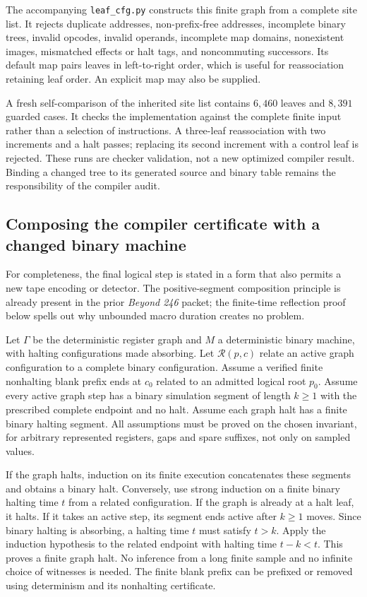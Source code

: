 The accompanying \texttt{leaf\_cfg.py} constructs this finite graph from
a complete site list.  It rejects duplicate addresses, non-prefix-free
addresses, incomplete binary trees, invalid opcodes, invalid operands,
incomplete map domains, nonexistent images, mismatched effects or halt
tags, and noncommuting successors.  Its default map pairs leaves in
left-to-right order, which is useful for reassociation retaining leaf
order.  An explicit map may also be supplied.

A fresh self-comparison of the inherited site list contains $6,460$
leaves and $8,391$ guarded cases.  It checks the implementation against
the complete finite input rather than a selection of instructions.
A three-leaf reassociation with two increments and a halt passes;
replacing its second increment with a control leaf is rejected.
These runs are checker validation, not a new optimized compiler result.
Binding a changed tree to its generated source and binary table remains
the responsibility of the compiler audit.

\subsection{Composing the compiler certificate with a changed binary machine}

For completeness, the final logical step is stated in a form that also
permits a new tape encoding or detector.  The positive-segment
composition principle is already present in the prior
\emph{Beyond 246} packet; the finite-time reflection proof below
spells out why unbounded macro duration creates no problem.

Let $\Gamma$ be the deterministic register graph and $M$ a deterministic
binary machine, with halting configurations made absorbing.  Let
$\mathcal R(p,c)$ relate an active graph configuration to a complete
binary configuration.  Assume a verified finite nonhalting blank prefix
ends at $c_0$ related to an admitted logical root $p_0$.  Assume every
active graph step has a binary simulation segment of length $k\geq1$
with the prescribed complete endpoint and no halt.  Assume each graph
halt has a finite binary halting segment.  All assumptions must be
proved on the chosen invariant, for arbitrary represented registers,
gaps and spare suffixes, not only on sampled values.

If the graph halts, induction on its finite execution concatenates
these segments and obtains a binary halt.  Conversely, use strong
induction on a finite binary halting time $t$ from a related
configuration.  If the graph is already at a halt leaf, it halts.  If
it takes an active step, its segment ends active after $k\geq1$ moves.
Since binary halting is absorbing, a halting time $t$ must satisfy
$t>k$.  Apply the induction hypothesis to the related endpoint with
halting time $t-k<t$.  This proves a finite graph halt.  No inference
from a long finite sample and no infinite choice of witnesses is
needed.  The finite blank prefix can be prefixed or removed using
determinism and its nonhalting certificate.

